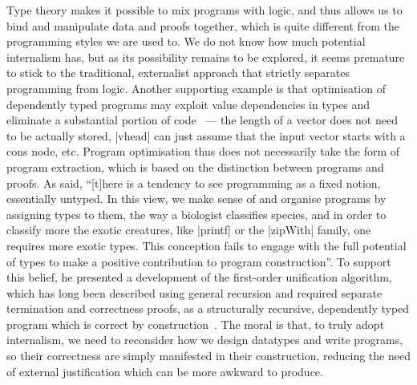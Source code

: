 Type theory makes it possible to mix programs with logic, and thus allows us to bind and manipulate data and proofs together, which is quite different from the programming styles we are used to.
We do not know how much potential internalism has, but as its possibility remains to be explored, it seems premature to stick to the traditional, externalist approach that strictly separates programming from logic.
Another supporting example is that optimisation of dependently typed programs may exploit value dependencies in types and eliminate a substantial portion of code~\citep{Brady-inductive-families-indices} --- the length of a vector does not need to be actually stored, |vhead| can just assume that the input vector starts with a cons node, etc.
Program optimisation thus does not necessarily take the form of program extraction, which is based on the distinction between programs and proofs.
As \citet{McBride-Epigram} said, ``[t]here is a tendency to see programming as a fixed notion, essentially untyped. In this view, we make sense of and organise programs by assigning types to them, the way a biologist classifies species, and in order to classify more the exotic creatures, like |printf| or the |zipWith| family, one requires more exotic types. This conception fails to engage with the full potential of types to make a positive contribution to program construction''.
To support this belief, he presented a development of the first-order unification algorithm, which has long been described using general recursion and required separate termination and correctness proofs, as a structurally recursive, dependently typed program which is correct by construction~\citep{McBride-unification}.
The moral is that, to truly adopt internalism, we need to reconsider how we design datatypes and write programs, so their correctness are simply manifested in their construction, reducing the need of external justification which can be more awkward to produce.
